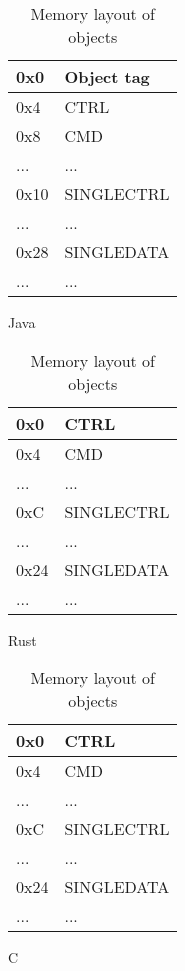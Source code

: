 \begin{table}[H]

  \centering
  \begin{subfigure}{0.31\textwidth}
    \begin{tabular}{|l|l|}
      \hline
      0x0&Object tag \\ \hline
      0x4&CTRL       \\ \hline
      0x8&CMD        \\ \hline
      ...&...        \\ \hline
      0x10&SINGLECTRL\\ \hline
      ...&...        \\ \hline
      0x28&SINGLEDATA\\ \hline
      ...&...        \\ \hline
    \end{tabular}
    \caption{Java}
    \label{fig:back:memlayout:java}
  \end{subfigure}
  \hfill
  \begin{subfigure}{0.31\textwidth}
    \begin{tabular}{|l|l|}
      \hline
      0x0&CTRL       \\ \hline
      0x4&CMD        \\ \hline
      ...&...        \\ \hline
      0xC&SINGLECTRL \\ \hline
      ...&...        \\ \hline
      0x24&SINGLEDATA\\ \hline
      ...&...        \\ \hline
    \end{tabular}
    \caption{Rust}
    \label{fig:back:memlayout:rust}
  \end{subfigure}
  \hfill
  \begin{subfigure}{0.31\textwidth}
    \begin{tabular}{|l|l|}
      \hline
      0x0&CTRL       \\ \hline
      0x4&CMD        \\ \hline
      ...&...        \\ \hline
      0xC&SINGLECTRL \\ \hline
      ...&...        \\ \hline
      0x24&SINGLEDATA\\ \hline
      ...&...        \\ \hline
    \end{tabular}
        \caption{C}
    \label{fig:back:memlayout:c}
  \end{subfigure}
  \caption{Memory layout of objects}
  \label{fig:back:memlayout}

\end{table}

